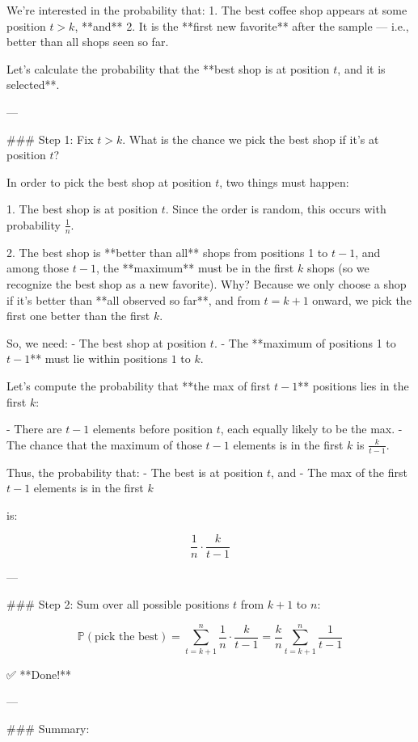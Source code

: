 We're interested in the probability that:
1. The best coffee shop appears at some position \( t > k \), **and**
2. It is the **first new favorite** after the sample — i.e., better than all shops seen so far.

Let's calculate the probability that the **best shop is at position \( t \), and it is selected**.

---

### Step 1: Fix \( t > k \). What is the chance we pick the best shop if it's at position \( t \)?

In order to pick the best shop at position \( t \), two things must happen:

1. The best shop is at position \( t \).  
   Since the order is random, this occurs with probability \( \frac{1}{n} \).

2. The best shop is **better than all** shops from positions 1 to \( t - 1 \), and among those \( t - 1 \), the **maximum** must be in the first \( k \) shops (so we recognize the best shop as a new favorite).  
   Why? Because we only choose a shop if it's better than **all observed so far**, and from \( t = k+1 \) onward, we pick the first one better than the first \( k \).

So, we need:
- The best shop at position \( t \).
- The **maximum of positions 1 to \( t-1 \)** must lie within positions \( 1 \) to \( k \).

Let's compute the probability that **the max of first \( t-1 \)** positions lies in the first \( k \):

- There are \( t - 1 \) elements before position \( t \), each equally likely to be the max.
- The chance that the maximum of those \( t-1 \) elements is in the first \( k \) is \( \frac{k}{t - 1} \).

Thus, the probability that:
- The best is at position \( t \), and
- The max of the first \( t-1 \) elements is in the first \( k \)

is:

\[
\frac{1}{n} \cdot \frac{k}{t - 1}
\]

---

### Step 2: Sum over all possible positions \( t \) from \( k+1 \) to \( n \):

\[
\mathbb{P}(\text{pick the best}) = \sum_{t = k+1}^{n} \frac{1}{n} \cdot \frac{k}{t - 1} = \frac{k}{n} \sum_{t = k+1}^n \frac{1}{t - 1}
\]

✅ **Done!**

---

### Summary:

